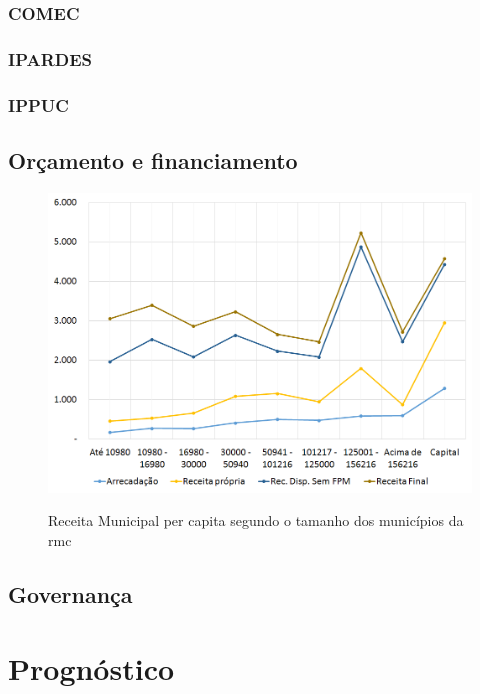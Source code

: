 	\subsection{COMEC}
	
	\subsection{IPARDES}
	
	\subsection{IPPUC}
	
	\section{Orçamento e financiamento}
		
	\begin{figure}
		\centering
		\caption{Receita Municipal per capita segundo o tamanho dos municípios da \gls{rmc}}
		\includegraphics[width=1.0\linewidth]{img/orcamento_A}
		\label{fig:orcamento}
	\end{figure}
	
	\section{Governança}
	
	\chapter{Prognóstico}
	
